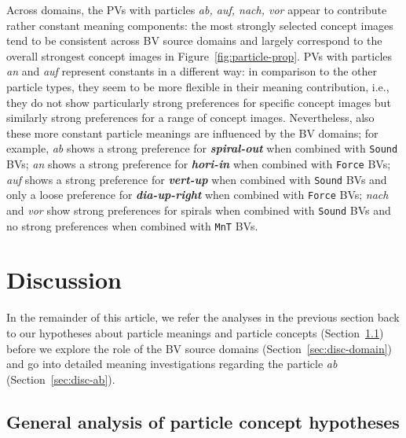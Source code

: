 \documentclass[output=paper]{langsci/langscibook}
\newcommand{\textci}[1]{\textit{\textbf{#1}}}
\begin{document}
Across domains, the PVs with particles \textit{ab, auf, nach, vor}
appear to contribute rather constant meaning components: the most
strongly selected concept images tend to be consistent across BV source domains
and largely correspond to the overall strongest concept images in
Figure~\ref{fig:particle-prop}. PVs with particles \textit{an} and
\textit{auf} represent constants in a different way: in comparison to
the other particle types, they seem to be more flexible in their
meaning contribution, i.e., they do not show particularly strong
preferences for specific concept images but similarly strong preferences for a
range of concept images.  Nevertheless, also these more constant particle
meanings are influenced by the BV domains; for example, \textit{ab}
shows a strong preference for \textci{spiral-out} when combined with
\texttt{Sound} BVs; \textit{an} shows a strong preference for
\textci{hori-in} when combined with \texttt{Force} BVs; \textit{auf}
shows a strong preference for \textci{vert-up} when combined with
\texttt{Sound} BVs and only a loose preference for
\textci{dia-up-right} when combined with \texttt{Force} BVs;
\textit{nach} and \textit{vor} show strong preferences for spirals
when combined with \texttt{Sound} BVs and no strong preferences when
combined with \texttt{MnT} BVs.


\clearpage
\section{Discussion}
\label{sec:2discussion}

In the remainder of this article, we refer the analyses in the
previous section back to our hypotheses about particle meanings and
particle concepts (Section~\ref{sec:disc-general}) before we explore
the role of the BV source domains (Section~\ref{sec:disc-domain}) and
go into detailed meaning investigations regarding the particle
\textit{ab} (Section~\ref{sec:disc-ab}).

\subsection{General analysis of particle concept hypotheses}
\label{sec:disc-general}
\end{document}

